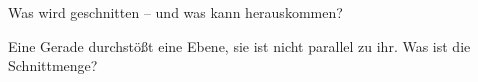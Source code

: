 \setcounter{aufgabe}{8}

\begin{aufgabe}{Was wird geschnitten – und was kann herauskommen?}
\begin{teile}
\teil Eine Gerade durchstößt eine Ebene, sie ist nicht parallel zu ihr. Was ist die Schnittmenge? \\  \\  \\ 
\end{teile}
\end{aufgabe}


